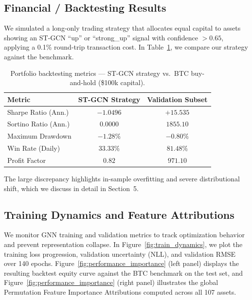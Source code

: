 \documentclass{article}
\begin{document}
\subsection{Financial / Backtesting Results}

We simulated a long-only trading strategy that allocates equal capital to assets showing an ST-GCN ``up'' or ``strong\_up'' signal with confidence $>0.65$, applying a 0.1\% round-trip transaction cost. In Table~\ref{tab:fin}, we compare our strategy against the benchmark.

\begin{table}[h]
  \centering
  \caption{Portfolio backtesting metrics --- ST-GCN strategy vs.\ BTC buy-and-hold (\$100k capital).}
  \vspace{3pt}
  \label{tab:fin}
  \setlength{\tabcolsep}{6pt}
  \begin{tabular}{lcc}
    \toprule
    Metric & ST-GCN Strategy & Validation Subset \\
    \midrule
    Sharpe Ratio (Ann.)  & $-1.0496$ & $+15.535$ \\
    Sortino Ratio (Ann.) & $0.0000$  & $1855.10$ \\
    Maximum Drawdown     & $-1.28\%$ & $-0.80\%$ \\
    Win Rate (Daily)     & $33.33\%$ & $81.48\%$ \\
    Profit Factor        & $0.82$    & $971.10$  \\
    \bottomrule
  \end{tabular}
\end{table}

The large discrepancy highlights in-sample overfitting and severe distributional shift, which we discuss in detail in Section~5.

\subsection{Training Dynamics and Feature Attributions}

We monitor GNN training and validation metrics to track optimization behavior and prevent representation collapse. In Figure~\ref{fig:train_dynamics}, we plot the training loss progression, validation uncertainty (NLL), and validation RMSE over 140 epochs. Figure~\ref{fig:performance_importance} (left panel) displays the resulting backtest equity curve against the BTC benchmark on the test set, and Figure~\ref{fig:performance_importance} (right panel) illustrates the global Permutation Feature Importance Attributions computed across all 107 assets.
\end{document}
